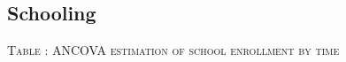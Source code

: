 \subsection{Schooling}


\hspace{-1cm}\begin{minipage}[t]{14cm}
\hfil\textsc{\normalsize Table \thetable: ANCOVA estimation of school enrollment by time\label{tab ANCOVA enroll time varying1}}\\
\setlength{\tabcolsep}{1pt}
\setlength{\baselineskip}{8pt}
\renewcommand{\arraystretch}{.525}
\hfil{}
\end{minipage}

